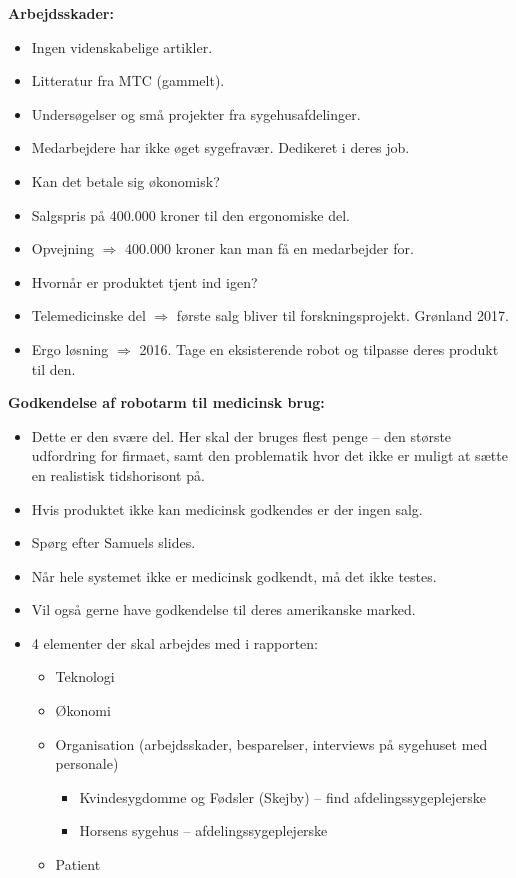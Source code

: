\textbf{Arbejdsskader:}
\begin{itemize}
\item Ingen videnskabelige artikler. 
\item Litteratur fra MTC (gammelt).
\item Undersøgelser og små projekter fra sygehusafdelinger.
\item Medarbejdere har ikke øget sygefravær. Dedikeret i deres job. 
\end{itemize}
\begin{itemize}
\item Kan det betale sig økonomisk? 
\item Salgspris på 400.000 kroner til den ergonomiske del. 
\item Opvejning $\Rightarrow$ 400.000 kroner kan man få en medarbejder for. 
\item Hvornår er produktet tjent ind igen?
\item Telemedicinske del $\Rightarrow$ første salg bliver til forskningsprojekt. Grønland 2017.
\item Ergo løsning $\Rightarrow$ 2016. Tage en eksisterende robot og tilpasse deres produkt til den.
\end{itemize}
\textbf{Godkendelse af robotarm til medicinsk brug:}
\begin{itemize}
\item Dette er den svære del. Her skal der bruges flest penge – den største udfordring for firmaet, samt den problematik hvor det ikke er muligt at sætte en realistisk tidshorisont på.
\item Hvis produktet ikke kan medicinsk godkendes er der ingen salg. 
\item Spørg efter Samuels slides.
\item Når hele systemet ikke er medicinsk godkendt, må det ikke testes. 
\item Vil også gerne have godkendelse til deres amerikanske marked.
\end{itemize}
\begin{itemize}
\item 4 elementer der skal arbejdes med i rapporten:
\begin{itemize}
\item Teknologi
\item Økonomi 
\item Organisation (arbejdsskader, besparelser, interviews på sygehuset med personale)
\begin{itemize}
\item Kvindesygdomme og Fødsler (Skejby) – find afdelingssygeplejerske
\item Horsens sygehus – afdelingssygeplejerske
\end{itemize}
\item Patient
\end{itemize}
\end{itemize}
